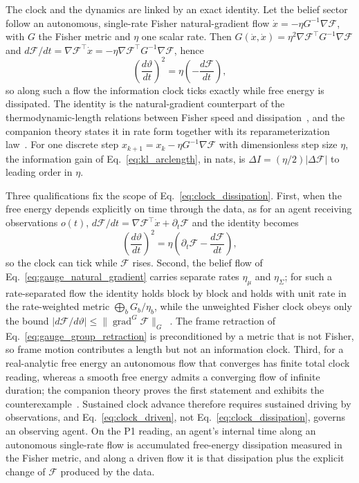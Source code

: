 The clock and the dynamics are linked by an exact identity. Let the belief sector follow an autonomous, single-rate Fisher natural-gradient flow $\dot{x} = -\eta G^{-1}\nabla\mathcal{F}$, with $G$ the Fisher metric and $\eta$ one scalar rate. Then $G(\dot{x}, \dot{x}) = \eta^2 \nabla\mathcal{F}^\top G^{-1}\nabla\mathcal{F}$ and $d\mathcal{F}/dt = \nabla\mathcal{F}^\top \dot{x} = -\eta \nabla\mathcal{F}^\top G^{-1}\nabla\mathcal{F}$, hence
\begin{equation}
\left(\frac{d\vartheta}{dt}\right)^2 = \eta\left(-\frac{d\mathcal{F}}{dt}\right),
\label{eq:clock_dissipation}
\end{equation}
so along such a flow the information clock ticks exactly while free energy is dissipated. The identity is the natural-gradient counterpart of the thermodynamic-length relations between Fisher speed and dissipation~\cite{SalamonBerry1983, Crooks2007, Ito2018}, and the companion theory states it in rate form together with its reparameterization law~\cite[Ch.~7]{DennisGaugeVFE2026}. For one discrete step $x_{k+1} = x_k - \eta G^{-1}\nabla\mathcal{F}$ with dimensionless step size $\eta$, the information gain of Eq.~\eqref{eq:kl_arclength}, in nats, is $\Delta I = (\eta/2)|\Delta\mathcal{F}|$ to leading order in $\eta$.

Three qualifications fix the scope of Eq.~\eqref{eq:clock_dissipation}. First, when the free energy depends explicitly on time through the data, as for an agent receiving observations $o(t)$, $d\mathcal{F}/dt = \nabla\mathcal{F}^\top\dot{x} + \partial_t\mathcal{F}$ and the identity becomes
\begin{equation}
\left(\frac{d\vartheta}{dt}\right)^2 = \eta\left(\partial_t\mathcal{F} - \frac{d\mathcal{F}}{dt}\right),
\label{eq:clock_driven}
\end{equation}
so the clock can tick while $\mathcal{F}$ rises. Second, the belief flow of Eq.~\eqref{eq:gauge_natural_gradient} carries separate rates $\eta_\mu$ and $\eta_\Sigma$; for such a rate-separated flow the identity holds block by block and holds with unit rate in the rate-weighted metric $\bigoplus_b G_b/\eta_b$, while the unweighted Fisher clock obeys only the bound $|d\mathcal{F}/d\vartheta| \le \|\operatorname{grad}^{G}\mathcal{F}\|_{G}$~\cite[Chs.~7 and~8]{DennisGaugeVFE2026}. The frame retraction of Eq.~\eqref{eq:gauge_group_retraction} is preconditioned by a metric that is not Fisher, so frame motion contributes a length but not an information clock. Third, for a real-analytic free energy an autonomous flow that converges has finite total clock reading, whereas a smooth free energy admits a converging flow of infinite duration; the companion theory proves the first statement and exhibits the counterexample~\cite[Ch.~7]{DennisGaugeVFE2026}. Sustained clock advance therefore requires sustained driving by observations, and Eq.~\eqref{eq:clock_driven}, not Eq.~\eqref{eq:clock_dissipation}, governs an observing agent. On the P1 reading, an agent's internal time along an autonomous single-rate flow is accumulated free-energy dissipation measured in the Fisher metric, and along a driven flow it is that dissipation plus the explicit change of $\mathcal{F}$ produced by the data.

